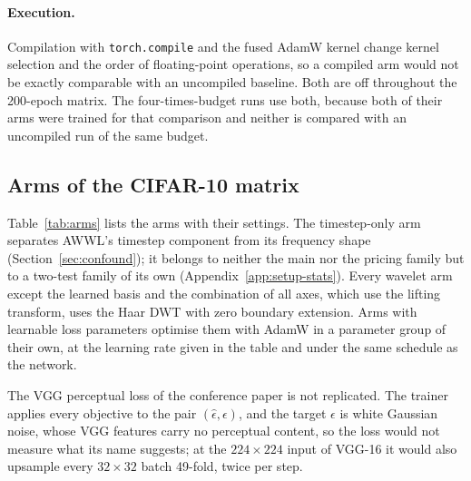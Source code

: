 \paragraph{Execution.}
Compilation with \texttt{torch.compile} and the fused AdamW kernel change
kernel selection and the order of floating-point operations, so a compiled arm
would not be exactly comparable with an uncompiled baseline. Both are off
throughout the 200-epoch matrix. The four-times-budget runs use both, because
both of their arms were trained for that comparison and neither is compared
with an uncompiled run of the same budget.

\subsection{Arms of the CIFAR-10 matrix}
\label{app:setup-arms}

Table~\ref{tab:arms} lists the arms with their settings. The timestep-only
arm separates AWWL's timestep component from its frequency shape
(Section~\ref{sec:confound}); it belongs to neither the main nor the pricing
family but to a two-test family of its own (Appendix~\ref{app:setup-stats}). Every wavelet arm except the learned basis
and the combination of all axes, which use the lifting transform, uses the
Haar DWT with zero boundary
extension. Arms with learnable loss parameters optimise them with AdamW in a
parameter group of their own, at the learning rate given in the table and
under the same schedule as the network.

The VGG perceptual loss of the conference paper is not replicated. The
trainer applies every objective to the pair $(\hat\epsilon, \epsilon)$, and
the target $\epsilon$ is white Gaussian noise, whose VGG features carry no
perceptual content, so the loss would not measure what its name suggests; at
the $224\times224$ input of VGG-16 it would also upsample every $32\times32$
batch 49-fold, twice per step.

